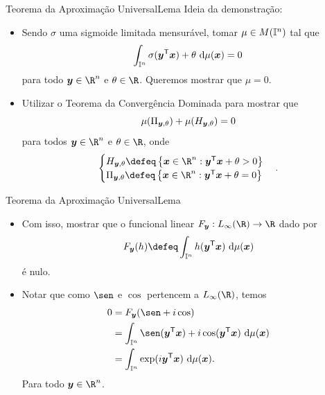 \documentclass[13pt]{beamer}
\begin{document}
\begin{frame}{Teorema da Aproximação Universal}{Lema}
    Ideia da demonstração:
    \begin{itemize}
        \item<1-> Sendo \( \sigma \) uma sigmoide limitada mensurável, tomar \( \mu \in M ( \mathbb{I}^{ n } ) \) tal que
            \begin{equation*}
                \int_{ \mathbb{I}^{ n } } \sigma ( \bm{y}^{ \mathsf{T} } \bm{x} ) + \theta \ \mathrm{d} \mu ( \bm{x} ) = 0
            \end{equation*}
            para todo \( \bfy \in \R^{ n } \) e \( \theta \in \R \).
            Queremos mostrar que \( \mu = 0 \).
        \item<2-> Utilizar o Teorema da Convergência Dominada para mostrar que
            \begin{equation*}
                \mu ( \Pi_{ \bm{y}, \theta } ) + \mu ( H_{ \bm{y}, \theta } ) = 0
            \end{equation*}
            para todos \( \bfy \in \R^{ n } \) e \( \theta \in \R \), onde
            \begin{equation*}
                \begin{cases}
                    H_{ \bfy, \theta } \defeq \left\{ \bfx \in \R^{ n } : \bfy^{ \transpose } \bfx + \theta > 0 \right\} \\
                    \Pi_{ \bfy, \theta } \defeq \left\{ \bfx \in \R^{ n } : \bfy^{ \transpose } \bfx + \theta = 0 \right\} \\
                \end{cases}
            .\end{equation*}
    \end{itemize}
\end{frame}


\begin{frame}{Teorema da Aproximação Universal}{Lema}
    \begin{itemize}
        \item<1-> Com isso, mostrar que o funcional linear \( F_{ \bfy } : L_{ \infty } ( \R ) \to \R \) dado por
            \begin{equation*}
                F_{ \bfy } ( h ) \defeq \int_{ \I^{ n } } h ( \bfy^{ \transpose } \bfx ) \ \mathrm{d} \mu ( \bfx )
            \end{equation*}
            é nulo.
        \item<2-> Notar que como \( \sen \) e \( \cos \) pertencem a \( L_{ \infty } ( \R ) \), temos
            \begin{align*}
                0 &= F_{ \bfy } ( \sen + i \cos ) \\
                  &= \int_{ \I^{ n } } \sen ( \bfy^{ \transpose } \bfx ) + i \cos ( \bfy^{ \transpose } \bfx ) \ \mathrm{d} \mu ( \bfx ) \\
                  &= \int_{ \I^{ n } } \exp ( i \bfy^{ \transpose } \bfx ) \ \mathrm{d} \mu ( \bfx )
            .\end{align*}
            Para todo \( \bfy \in \R^{ n } \).
    \end{itemize}
\end{frame}
\end{document}

